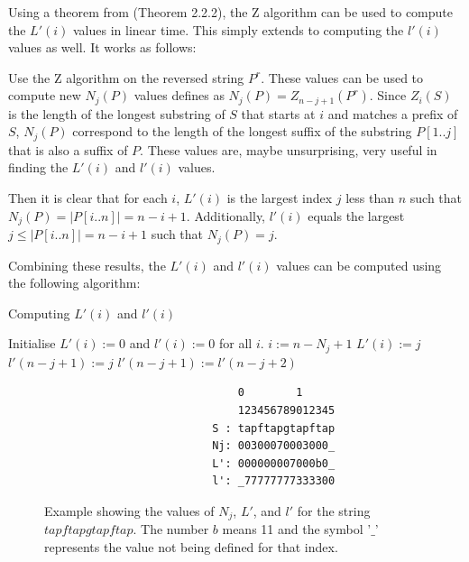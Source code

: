 Using a theorem from \cite{Gusfield1997AlgorithmsOS} (Theorem 2.2.2), the Z algorithm can be used to compute the $L'(i)$ values in linear time. This simply extends to computing the $l'(i)$ values as well. It works as follows:

Use the Z algorithm on the reversed string $P^r$. These values can be used to compute new $N_j(P)$ values defines as $N_j(P)=Z_{n-j+1}(P^r)$. Since $Z_i(S)$ is the length of the longest substring of $S$ that starts at $i$ and matches a prefix of $S$, $N_j(P)$ correspond to the length of the longest suffix of the substring $P[1..j]$ that is also a suffix of $P$. These values are, maybe unsurprising, very useful in finding the $L'(i)$ and $l'(i)$ values. 

Then it is clear that for each $i$, $L'(i)$ is the largest index $j$ less than $n$ such that $N_j(P)=|P[i..n]|=n-i+1$. Additionally, $l'(i)$ equals the largest $j\leq|P[i..n]|=n-i+1$ such that $N_j(P)=j$. 

Combining these results, the $L'(i)$ and $l'(i)$ values can be computed using the following algorithm:

\begin{algorithm}
\caption{Computing $L'(i)$ and $l'(i)$}\label{alg:Lvalues}
\begin{algorithmic}
\State Initialise $L'(i):=0$ and $l'(i):=0$ for all $i$. 
        \State $i:=n-N_j+1$
        \State $L'(i):=j$
    \EndIf
\EndFor
{}
    \State $l'(n-j+1) := j$
    \Else
    \State $l'(n-j+1) := l'(n-j+2)$ 
    \EndIf
\EndFor
\end{algorithmic}
\end{algorithm}

\begin{figure}[h!]
\begin{verbatim}
                              0        1      
                              123456789012345 
                          S : tapftapgtapftap 
                          Nj: 00300070003000_ 
                          L': 000000007000b0_ 
                          l': _77777777333300 
\end{verbatim}
\caption{Example showing the values of $N_j$, $L'$, and $l'$ for the string $tapftapgtapftap$. The number $b$ means 11 and the symbol '$\_$' represents the value not being defined for that index. }
\label{fig:gsr-example}
\end{figure}


